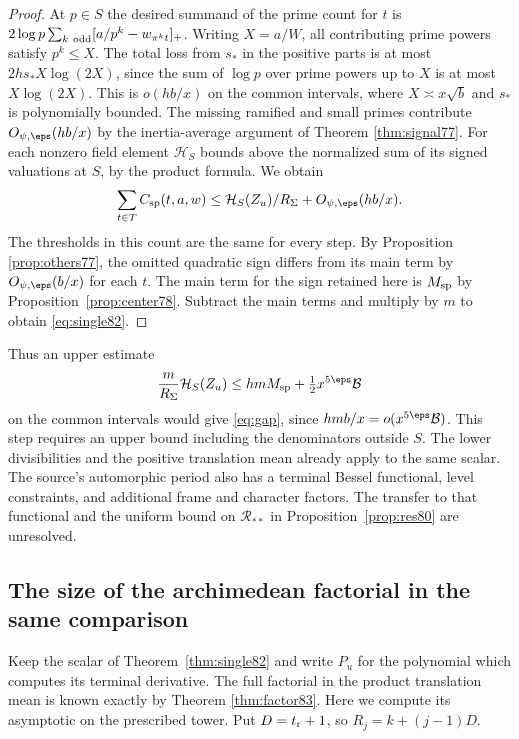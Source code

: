 \documentclass[a4paper,11pt]{article}
\theoremstyle{definition}
\theoremstyle{remark}
\numberwithin{equation}{section}
\begin{document}
\begin{proof}
At \(p\in S\) the desired summand of the prime count for \(t\)
is \(2\log p\sum_{k\ {\rm odd}}[a/p^k-w_{\pi^k t}]_+\).
Writing \(X=a/W\), all contributing prime powers satisfy \(p^k\le X\).
The total loss from \(s_*\) in the positive parts is at most
\(2hs_*X\log(2X)\), since the sum of \(\log p\) over prime powers
up to \(X\) is at most \(X\log(2X)\). This is \(o(hb/x)\) on
the common intervals, where \(X\asymp x\sqrt b\) and \(s_*\) is
polynomially bounded. The missing ramified and small primes
contribute \(O_{\psi,\eps}(hb/x)\) by the inertia-average argument
of Theorem \ref{thm:signal77}. For each nonzero field element
\(\mathcal H_S\) bounds above the normalized sum of its signed
valuations at \(S\), by the product formula. We obtain
\[
 \sum_{t\in T} C_{\rm sp}(t,a,w)
       \le \mathcal H_S(Z_u)/R_\Sigma+O_{\psi,\eps}(hb/x).
\]
The thresholds in this count are the same for every step.
By Proposition \ref{prop:others77}, the omitted quadratic sign
differs from its main term by \(O_{\psi,\eps}(b/x)\) for each
\(t\). The main term for the sign retained here is \(M_{\rm sp}\)
by Proposition~\ref{prop:center78}. Subtract the main terms and
multiply by \(m\) to obtain \eqref{eq:single82}.
\end{proof}

Thus an upper estimate
\[
  \frac{m}{R_\Sigma}\mathcal H_S(Z_u)
       \le hm M_{\rm sp}+\tfrac12 x^{5\eps}\mathcal B
\]
on the common intervals would give \eqref{eq:gap}, since
\(hmb/x=o(x^{5\eps}\mathcal B)\). This step requires an upper
bound including the denominators outside \(S\). The lower
divisibilities and the positive translation mean already apply
to the same scalar. The source's automorphic period also has a
terminal Bessel functional, level constraints, and additional
frame and character factors. The transfer to that functional and
the uniform bound on \(\mathcal R_{**}\) in
Proposition~\ref{prop:res80} are unresolved.

\subsection{The size of the archimedean factorial in the same comparison}\label{nav:VI-19}
Keep the scalar of Theorem~\ref{thm:single82} and write \(P_u\)
for the polynomial which computes its terminal derivative. The
full factorial in the product translation mean is known exactly
by Theorem \ref{thm:factor83}.
Here we compute its asymptotic on the prescribed tower. Put
\(D=t_{\rm r}+1\), so \(R_j=k+(j-1)D\).
\end{document}
